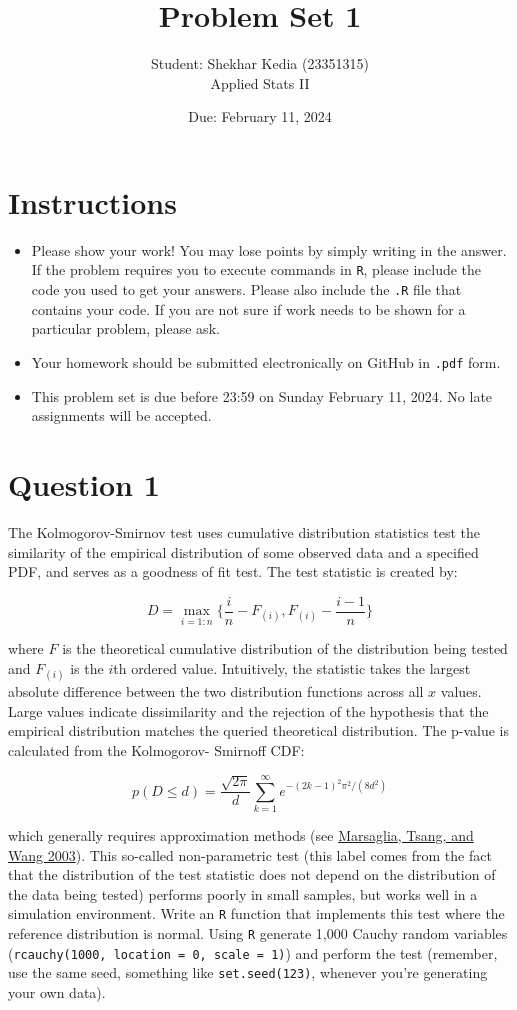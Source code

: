\documentclass[12pt,letterpaper]{article}
\title{Problem Set 1}
\date{Due: February 11, 2024}
\author{Student: Shekhar Kedia (23351315)\\Applied Stats II}
\begin{document}
	\maketitle
	\section*{Instructions}
	\begin{itemize}
	\item Please show your work! You may lose points by simply writing in the answer. If the problem requires you to execute commands in \texttt{R}, please include the code you used to get your answers. Please also include the \texttt{.R} file that contains your code. If you are not sure if work needs to be shown for a particular problem, please ask.
\item Your homework should be submitted electronically on GitHub in \texttt{.pdf} form.
\item This problem set is due before 23:59 on Sunday February 11, 2024. No late assignments will be accepted.
	\end{itemize}

	\vspace{.25cm}
\section*{Question 1} 
\vspace{.25cm}
\noindent The Kolmogorov-Smirnov test uses cumulative distribution statistics test the similarity of the empirical distribution of some observed data and a specified PDF, and serves as a goodness of fit test. The test statistic is created by:

$$D = \max_{i=1:n} \Big\{ \frac{i}{n}  - F_{(i)}, F_{(i)} - \frac{i-1}{n} \Big\}$$

\noindent where $F$ is the theoretical cumulative distribution of the distribution being tested and $F_{(i)}$ is the $i$th ordered value. Intuitively, the statistic takes the largest absolute difference between the two distribution functions across all $x$ values. Large values indicate dissimilarity and the rejection of the hypothesis that the empirical distribution matches the queried theoretical distribution. The p-value is calculated from the Kolmogorov-
Smirnoff CDF:

$$p(D \leq d)= \frac{\sqrt {2\pi}}{d} \sum _{k=1}^{\infty }e^{-(2k-1)^{2}\pi ^{2}/(8d^{2})}$$


\noindent which generally requires approximation methods (see \href{https://core.ac.uk/download/pdf/25787785.pdf}{Marsaglia, Tsang, and Wang 2003}). This so-called non-parametric test (this label comes from the fact that the distribution of the test statistic does not depend on the distribution of the data being tested) performs poorly in small samples, but works well in a simulation environment. Write an \texttt{R} function that implements this test where the reference distribution is normal. Using \texttt{R} generate 1,000 Cauchy random variables (\texttt{rcauchy(1000, location = 0, scale = 1)}) and perform the test (remember, use the same seed, something like \texttt{set.seed(123)}, whenever you're generating your own data).\\
	
\end{document}
